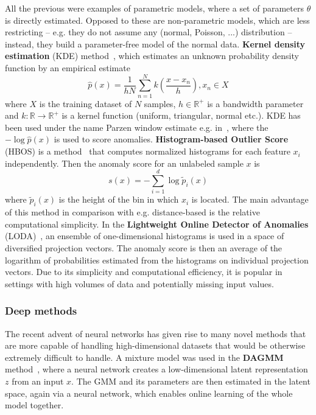 All the previous were examples of parametric models, where a set of parameters $\theta$ is directly estimated. Opposed to these are non-parametric models, which are less restricting  -- e.g. they do not assume any (normal, Poisson, ...) distribution -- instead, they build a parameter-free model of the normal data. \textbf{Kernel density estimation} (KDE) method~\cite{parzen1962estimation}, which estimates an unknown probability density function by an empirical estimate
\begin{equation} \label{eq:kde}
	\hat{p}(x) = \frac{1}{hN} \sum_{n=1}^N k \left( \frac{x-x_n}{h} \right), x_n \in X
\end{equation}
where $X$ is the training dataset of $N$ samples, $h \in \mathbb{R}^+$ is a bandwidth parameter and $k:\mathbb{R} \rightarrow \mathbb{R}^+$ is a kernel function (uniform, triangular, normal etc.). KDE has been used under the name Parzen window estimate e.g. in~\cite{tarassenko1995novelty,yeung2002parzen}, where the $-\log \hat{p}(x)$ is used to score anomalies. \textbf{Histogram-based Outlier Score} (HBOS) is a method~\cite{goldstein2012histogram} that computes normalized histograms for each feature $x_i$ independently. Then the anomaly score for an unlabeled sample $x$ is
\begin{equation} \label{eq:hbos}
	s(x) =  -\sum_{i=1}^d \log \tilde{p}_i(x)
\end{equation}
where $\tilde{p}_i(x)$ is the height of the bin in which $x_i$ is located. The main advantage of this method in comparison with e.g. distance-based is the relative computational simplicity. In the \textbf{Lightweight Online Detector of Anomalies} (LODA)~\cite{pevny2016loda}, an ensemble of one-dimensional histograms is used in a space of diversified projection vectors. The anomaly score is then an average of the logarithm of probabilities estimated from the histograms on individual projection vectors. Due to its simplicity and computational efficiency, it is popular in settings with high volumes of data and potentially missing input values.

\subsubsection{Deep methods}
The recent advent of neural networks has given rise to many novel methods that are more capable of handling high-dimensional datasets that would be otherwise extremely difficult to handle. A mixture model was used in the \textbf{DAGMM} method~\cite{zong2018deep}, where a neural network creates a low-dimensional latent representation $z$ from an input $x$. The GMM and its parameters are then estimated in the latent space, again via a neural network, which enables online learning of the whole model together.

